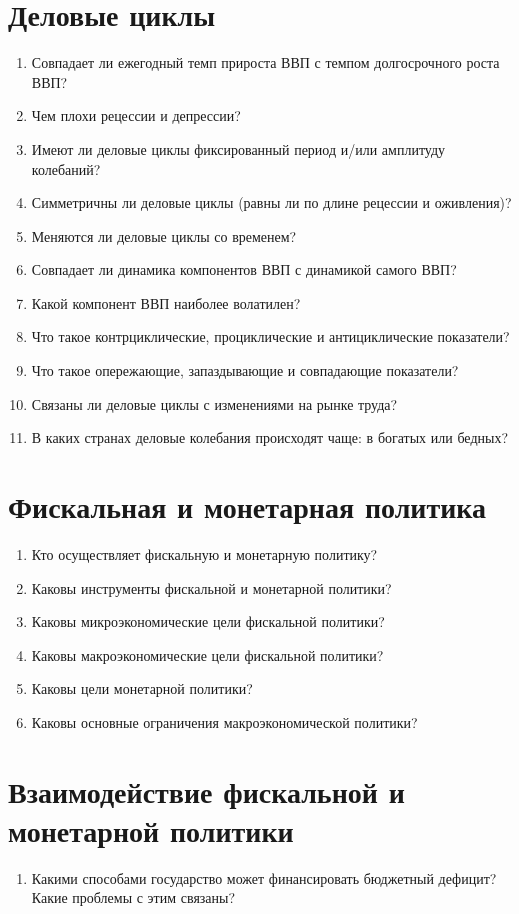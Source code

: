 \documentclass[10pt, a4paper]{extarticle}
\begin{document}
\section{Деловые циклы}
\begin{enumerate}
	\item Совпадает ли ежегодный темп прироста ВВП с темпом долгосрочного роста ВВП? 
	\item Чем плохи рецессии и депрессии?
	\item Имеют ли деловые циклы фиксированный период и/или амплитуду колебаний?
	\item Симметричны ли деловые циклы (равны ли по длине рецессии и оживления)? 
	\item Меняются ли деловые циклы со временем? 
	\item Совпадает ли динамика компонентов ВВП с динамикой самого ВВП?
	\item Какой компонент ВВП наиболее волатилен?
	\item Что такое контрциклические, проциклические и антициклические показатели?
	\item Что такое опережающие, запаздывающие и совпадающие показатели?
	\item Связаны ли деловые циклы с изменениями на рынке труда? 
	\item В каких странах деловые колебания происходят чаще: в богатых или бедных? 
\end{enumerate}

\section{Фискальная и монетарная политика}
\begin{enumerate}
	\item Кто осуществляет фискальную и монетарную политику?
	\item Каковы инструменты фискальной и монетарной политики?
	\item Каковы микроэкономические цели фискальной политики?
	\item Каковы макроэкономические цели фискальной политики?
	\item Каковы цели монетарной политики? 
	\item Каковы основные ограничения макроэкономической политики?
\end{enumerate}

\section{Взаимодействие фискальной и монетарной политики}
\begin{enumerate}
	\item Какими способами государство может финансировать бюджетный дефицит? Какие проблемы с этим связаны?
\end{enumerate}
\end{document}
